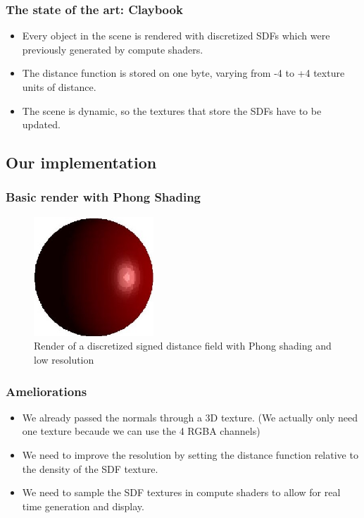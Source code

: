 \documentclass[handout]{beamer}
\begin{document}
\begin{frame}
  \frametitle{The state of the art: Claybook}
  \begin{itemize}
    \item Every object in the scene is rendered with discretized SDFs which were previously generated by compute shaders.
    \item The distance function is stored on one byte, varying from -4 to +4 texture units of distance.
    \item The scene is dynamic, so the textures that store the SDFs have to be updated.
  \end{itemize}
\end{frame}

\subsection{Our implementation}
\begin{frame}
  \frametitle{Basic render with Phong Shading}
  \begin{figure}
    \centering
    \includegraphics[width=0.4\textwidth]{figures/discretized_sdf_256.JPG}
    \caption{Render of a discretized signed distance field with Phong shading and low resolution}
    \label{fig:discretized-sdf-implemetation}
  \end{figure}
\end{frame}

\begin{frame}
  \frametitle{Ameliorations}
  \begin{itemize}
    \item We already passed the normals through a 3D texture. (We actually only need one texture becaude we can use the 4 RGBA channels)
    \item We need to improve the resolution by setting the distance function relative to the density of the SDF texture.
    \item We need to sample the SDF textures in compute shaders to allow for real time generation and display.
  \end{itemize}
  
\end{frame}
\end{document}
